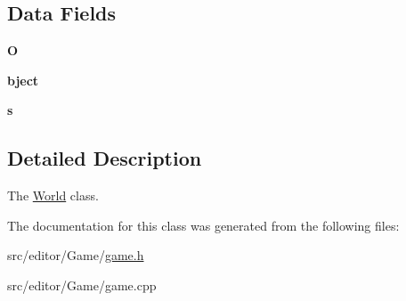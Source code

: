 \subsection*{\-Data \-Fields}
\begin{DoxyCompactItemize}
\item 
\hypertarget{class_world_a180c9e33dc6e59ca8e097bc9e6a36503}{{\bfseries \-O}}\label{class_world_a180c9e33dc6e59ca8e097bc9e6a36503}

\item 
\hypertarget{class_world_a2c3ed57fb27e57a197a2218f196950e2}{{\bfseries bject}}\label{class_world_a2c3ed57fb27e57a197a2218f196950e2}

\item 
\hypertarget{class_world_a985aab8b792338c2a1718f4ec46f88dc}{{\bfseries s}}\label{class_world_a985aab8b792338c2a1718f4ec46f88dc}

\end{DoxyCompactItemize}


\subsection{\-Detailed \-Description}
\-The \hyperlink{class_world}{\-World} class. 

\-The documentation for this class was generated from the following files\-:\begin{DoxyCompactItemize}
\item 
src/editor/\-Game/\hyperlink{game_8h}{game.\-h}\item 
src/editor/\-Game/game.\-cpp\end{DoxyCompactItemize}
